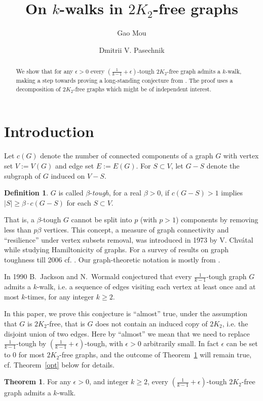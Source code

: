 \documentclass{amsart}
\theoremstyle{definition}
\newtheorem{theorem}{Theorem}
\newtheorem{definition}{Definition}
\newcommand{\ncc}{c}
\begin{document}
\author{Gao Mou}
\address{School of Physical and Mathematical Sciences, Nanyang Technological University, Singapore} 
\author{Dmitrii V. Pasechnik}
\address{Department of Computer Science, The University of Oxford, UK}

\title{On $k$-walks in $2K_2$-free graphs}
\begin{abstract}
We show that for any $\epsilon>0$ every $(\frac{1}{k-1}+\epsilon)$-tough
$2K_2$-free graph admits a $k$-walk, making a step towards proving a
long-standing conjecture from \cite{jackson1990k}. The proof uses a
decomposition of $2K_2$-free graphs which might be of independent interest.
\end{abstract}

\maketitle

\section{Introduction}

Let  $\ncc(G)$ denote the number of connected components of a graph $G$ with vertex set $V:=V(G)$ and edge set $E:=E(G)$. For $S\subset V$, let $G-S$ denote the subgraph of $G$ induced on $V-S$.
\begin{definition}
$G$ is called $\beta$-{\em tough},
for a real $\beta>0$, if $\ncc(G-S)>1$ implies $|S|\ge \beta\cdot \ncc(G-S)$ 
for each $S\subset V$.
\end{definition}
That is, a $\beta$-tough 
$G$ cannot be split into $p$ (with $p>1$) components by removing less than
$p\beta$ vertices.  
This concept, a measure of graph connectivity and ``resilience'' under vertex subsets removal,
was introduced in 1973 by V. Chv\'{a}tal 
while studying   Hamiltonicity of graphs. For a survey of results on graph toughness till 2006
cf. \cite{MR2221006}. Our graph-theoretic notation is mostly from \cite{bomu08}.

In 1990 B.~Jackson and N.~Wormald conjectured \cite{jackson1990k} that every
$\frac{1}{k-1}$-tough graph $G$ admits a $k$-walk, i.e. a sequence of edges
visiting each vertex at least once and at most $k$-times, for any integer $k\ge2$. 

In this paper, we prove this conjecture is ``almost'' true, under the
assumption that $G$ is  $2K_2$-free, that is $G$ does not contain an induced
copy of $2K_2$, i.e. the disjoint union of two edges.  Here by ``almost'' we
mean that we need to replace $\frac{1}{k-1}$-tough by
$(\frac{1}{k-1}+\epsilon)$-tough, with $\epsilon>0$ arbitrarily small.  In fact
$\epsilon$ can be set to 0 for most $2K_2$-free graphs, and the outcome of
Theorem~\ref{thm2} will remain true, cf. Theorem~\ref{opt} below for details.
\begin{theorem}\label{thm2} 
For any $\epsilon>0$, and integer $k\ge2$, every
$(\frac{1}{k-1}+\epsilon)$-tough $2K_2$-free graph admits a $k$-walk.
\end{theorem}
\end{document}
